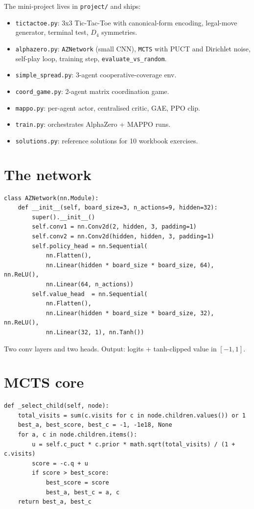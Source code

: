 \documentclass[11pt,oneside]{scrbook}
\begin{document}
The mini-project lives in \texttt{project/} and ships:

\begin{itemize}\setlength\itemsep{1pt}
  \item \texttt{tictactoe.py}: 3x3 Tic-Tac-Toe with canonical-form
    encoding, legal-move generator, terminal test, $D_4$ symmetries.
  \item \texttt{alphazero.py}: \texttt{AZNetwork} (small CNN), \texttt{MCTS}
    with PUCT and Dirichlet noise, self-play loop, training step,
    \texttt{evaluate\_vs\_random}.
  \item \texttt{simple\_spread.py}: 3-agent cooperative-coverage env.
  \item \texttt{coord\_game.py}: 2-agent matrix coordination game.
  \item \texttt{mappo.py}: per-agent actor, centralised critic, GAE,
    PPO clip.
  \item \texttt{train.py}: orchestrates AlphaZero + MAPPO runs.
  \item \texttt{solutions.py}: reference solutions for 10 workbook
    exercises.
\end{itemize}

\section{The network}

\begin{verbatim}
class AZNetwork(nn.Module):
    def __init__(self, board_size=3, n_actions=9, hidden=32):
        super().__init__()
        self.conv1 = nn.Conv2d(2, hidden, 3, padding=1)
        self.conv2 = nn.Conv2d(hidden, hidden, 3, padding=1)
        self.policy_head = nn.Sequential(
            nn.Flatten(),
            nn.Linear(hidden * board_size * board_size, 64), nn.ReLU(),
            nn.Linear(64, n_actions))
        self.value_head  = nn.Sequential(
            nn.Flatten(),
            nn.Linear(hidden * board_size * board_size, 32), nn.ReLU(),
            nn.Linear(32, 1), nn.Tanh())
\end{verbatim}

Two conv layers and two heads. Output: logits + tanh-clipped value in
$[-1, 1]$.

\section{MCTS core}

\begin{verbatim}
def _select_child(self, node):
    total_visits = sum(c.visits for c in node.children.values()) or 1
    best_a, best_score, best_c = -1, -1e18, None
    for a, c in node.children.items():
        u = self.c_puct * c.prior * math.sqrt(total_visits) / (1 + c.visits)
        score = -c.q + u
        if score > best_score:
            best_score = score
            best_a, best_c = a, c
    return best_a, best_c
\end{verbatim}
\end{document}
